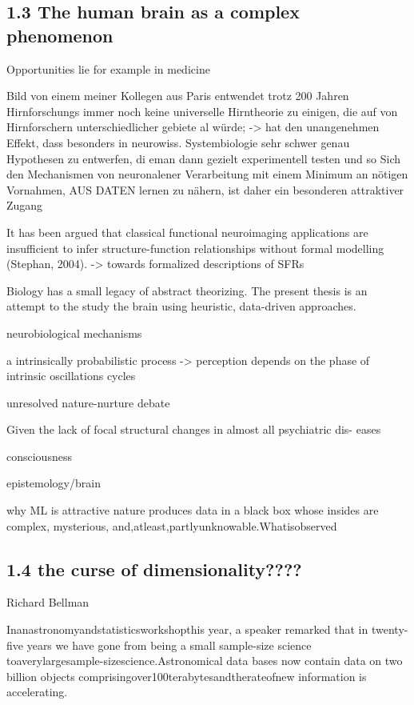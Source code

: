 \documentclass[authoryear,review,3p]{elsarticle}
\begin{document}
\subsection*{1.3 The human brain as a complex phenomenon}

Opportunities lie for example in medicine

Bild von einem meiner Kollegen aus Paris entwendet
trotz 200 Jahren Hirnforschungs immer noch keine universelle Hirntheorie zu einigen, die auf von Hirnforschern unterschiedlicher gebiete al würde;
-> hat den unangenehmen Effekt, dass besonders in neurowiss. Systembiologie sehr schwer genau Hypothesen zu entwerfen, di eman dann gezielt experimentell testen und so
Sich den Mechanismen von neuronalener Verarbeitung mit einem Minimum an nötigen Vornahmen, AUS DATEN lernen zu nähern, ist daher ein besonderen attraktiver Zugang


It has been argued that classical functional neuroimaging applications
are insufficient to infer structure-function relationships
without formal modelling (Stephan, 2004).
-> towards formalized descriptions of SFRs


Biology has a small legacy of abstract theorizing.
The present thesis is an attempt to the study the brain using
heuristic, data-driven approaches.

neurobiological mechanisms

a intrinsically probabilistic process
-> perception depends on the phase of intrinsic oscillations cycles

unresolved nature-nurture debate

Given the lack of focal structural changes in almost all psychiatric dis- eases

consciousness




epistemology/brain

why ML is attractive
nature produces data in a black box whose insides are complex, mysterious, and,atleast,partlyunknowable.Whatisobserved


\subsection*{1.4 the curse of dimensionality????}

Richard Bellman

Inanastronomyandstatisticsworkshopthis year, a speaker remarked that in twenty-five years we have gone from being a small sample-size science toaverylargesample-sizescience.Astronomical data bases now contain data on two billion objects comprisingover100terabytesandtherateofnew information is accelerating.
\end{document}
